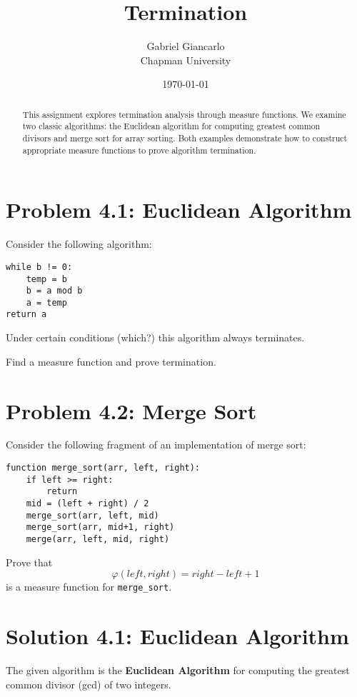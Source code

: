 \documentclass{article}
\title{Termination}
\author{Gabriel Giancarlo \\ Chapman University}
\date{\today}
\theoremstyle{plain}
\theoremstyle{definition}
\theoremstyle{remark}
\begin{document}
\maketitle

\begin{abstract}
This assignment explores termination analysis through measure functions. We examine two classic algorithms: the Euclidean algorithm for computing greatest common divisors and merge sort for array sorting. Both examples demonstrate how to construct appropriate measure functions to prove algorithm termination.
\end{abstract}

\section{Problem 4.1: Euclidean Algorithm}

Consider the following algorithm:

\begin{verbatim}
while b != 0:
    temp = b
    b = a mod b
    a = temp
return a
\end{verbatim}

Under certain conditions (which?) this algorithm always terminates.  

Find a measure function and prove termination.

\section{Problem 4.2: Merge Sort}

Consider the following fragment of an implementation of merge sort:

\begin{verbatim}
function merge_sort(arr, left, right):
    if left >= right:
        return
    mid = (left + right) / 2
    merge_sort(arr, left, mid)
    merge_sort(arr, mid+1, right)
    merge(arr, left, mid, right)
\end{verbatim}

Prove that
\[
    \varphi(left, right) = right - left + 1
\]
is a measure function for \texttt{merge\_sort}.

\section{Solution 4.1: Euclidean Algorithm}

The given algorithm is the \textbf{Euclidean Algorithm} for computing the greatest common divisor (gcd) of two integers.
\end{document}
